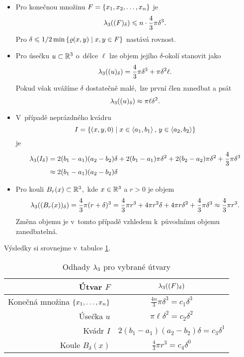 \begin{itemize}
    \item Pro konečnou množinu $F=\left\{x_1,x_2,\ldots,x_n\right\}$ je
    \[\lambda_3((F)_\delta)\leqslant n\cdot\dfrac{4}{3}\pi\delta^3.\]
    Pro $\delta\leqslant1/2\min\left\{\varrho(x,y)\mid x,y\in F\right\}$ nastává rovnost.
    \item Pro úsečku $u\subset\mathbb{R}^3$ o~délce $\ell$ lze objem jejího $\delta$-okolí stanovit jako
    \[\lambda_3((u)_\delta)=\dfrac{4}{3}\pi \delta^3+\pi\delta^2\ell.\]
    Pokud však uvážíme $\delta$ dostatečně malé,~lze první člen zanedbat a psát
    \[\lambda_3((u)_\delta)\approx\pi\ell\delta^2.\]
    \item V~případě neprázdného kvádru
    \[I=\left\{(x,y,0)\mid x\in\langle a_1,b_1\rangle\,,\,y\in\langle a_2,b_2\rangle\right\}\]
    je
    \begin{align*}
        \lambda_3(I_\delta)&=2(b_1-a_1)(a_2-b_2)\delta+2(b_1-a_1)\pi\delta^2+2(b_2-a_2)\pi\delta^2+\dfrac{4}{3}\pi\delta^3\\
        &\approx 2(b_1-a_1)(a_2-b_2)\delta
    \end{align*}
    \item Pro kouli $B_r(x)\subset\mathbb{R}^3$,~kde $x\in\mathbb{R}^3$ a $r>0$ je objem
    \[\lambda_3((B_r(x))_\delta)=\dfrac{4}{3}\pi (r+\delta)^3=\dfrac{4}{3}\pi r^3+4\pi r^2\delta+4\pi r\delta^2+\dfrac{4}{3}\pi\delta^3\approx\dfrac{4}{3}\pi r^3.\]
    Změna objemu je v~tomto případě vzhledem k~původnímu objemu zanedbatelná.
\end{itemize}
Výsledky si srovnejme v~tabulce \ref{table:odhady-lambda_3}.
\begin{table}[h]
    \centering
    \begin{tabular}{r|c}
    Útvar $F$                               & $\lambda_3((F)_\delta)$       \\\hline
    Konečná množina $\left\{x_1,\ldots,x_n\right\}$ & $\frac{4n}{3}\pi\delta^3=c_1\delta^3$   \\
    Úsečka $u$                             & $\pi\ell\delta^2=c_2\delta^2$           \\
    Kvádr $I$                              & $2(b_1-a_1)(a_2-b_2)\delta=c_3\delta^1$ \\
    Koule $B_\delta(x)$                    & $\frac{4}{3}\pi r^3=c_4\delta^0$      
    \end{tabular}
    \caption{Odhady $\lambda_3$ pro vybrané útvary}
    \label{table:odhady-lambda_3}
\end{table}
